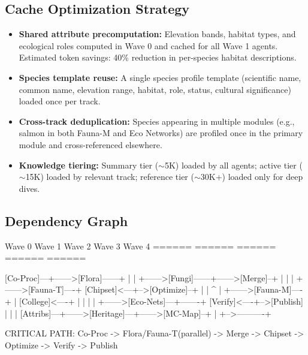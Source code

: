 \documentclass[11pt,letterpaper]{article}
\begin{document}
\subsection{Cache Optimization Strategy}

\begin{itemize}[leftmargin=2em]
\item \textbf{Shared attribute precomputation:} Elevation bands, habitat types, and ecological roles computed in Wave 0 and cached for all Wave 1 agents. Estimated token savings: 40\% reduction in per-species habitat descriptions.
\item \textbf{Species template reuse:} A single species profile template (scientific name, common name, elevation range, habitat, role, status, cultural significance) loaded once per track.
\item \textbf{Cross-track deduplication:} Species appearing in multiple modules (e.g., salmon in both Fauna-M and Eco Networks) are profiled once in the primary module and cross-referenced elsewhere.
\item \textbf{Knowledge tiering:} Summary tier ($\sim$5K) loaded by all agents; active tier ($\sim$15K) loaded by relevant track; reference tier ($\sim$30K+) loaded only for deep dives.
\end{itemize}

\subsection{Dependency Graph}

\begin{asciibox}
  Wave 0                Wave 1                    Wave 2         Wave 3        Wave 4
  ======                ======                    ======         ======        ======

  [Co-Proc]---+------>[Flora]------+
              |                    |
              +------>[Fungi]------+------>[Merge]--+
              |                    |                 |
              +------>[Fauna-T]----+   [Chipset]<---+-->[Optimize]--+
              |                    |       ^                        |
              +------>[Fauna-M]----+       |         [College]<----+
              |                    |       |                       |
              +------>[Eco-Nets]---+-------+         [Verify]<----+-->[Publish]
              |                    |                               |
  [Attribs]---+------>[Heritage]---+------>[MC-Map]--+            |
                                                     +-->----------+

  CRITICAL PATH: Co-Proc -> Flora/Fauna-T(parallel) -> Merge -> Chipset
                 -> Optimize -> Verify -> Publish
\end{asciibox}
\end{document}
